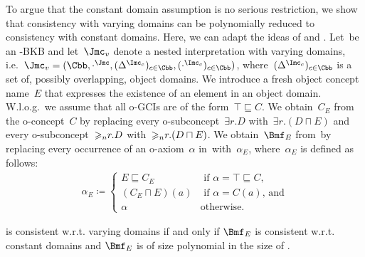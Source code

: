 To argue that the constant domain assumption is no serious restriction, we show that consistency
with varying domains can be polynomially reduced to consistency with constant domains. Here, we can
adapt the ideas of \cite{GKW+-03} and \cite{LuWZ-TIME08}. Let~\Bmf be an \LMLO-BKB and let~$\J_{v}$
denote a nested interpretation with varying domains, i.e.\
$\J_{v} = (\Cbb,\cdot^{\J},(\Delta^{\I_{c}})_{c\in\Cbb},(\cdot^{\I_c})_{c\in\Cbb})$,
where~$(\Delta^{\I_{c}})_{c\in\Cbb}$ is a set of, possibly overlapping, object domains. We introduce
a fresh object concept name~$E$ that expresses the existence of an element in an object
domain. W.l.o.g.\ we assume that all o-GCIs are of the form~$\top \sqsubseteq C$. We obtain~$C_{E}$
from the o-concept~$C$ by replacing every o-subconcept~$\exists r.D$ with~$\exists r.(D \sqcap E)$
and every o-subconcept~${\geqslant_{n}}r.D$ with~${\geqslant_{n}}r.(D \sqcap E)$. We obtain~$\Bmf_{E}$
from~\Bmf by replacing every occurrence of an o-axiom~$\alpha$ in~\Bmf with~$\alpha_{E}$,
where~$\alpha_{E}$ is defined as follows:
\begin{align*}
  \alpha_{E} \coloneqq
  \begin{cases}
    E \sqsubseteq C_{E} & \text{ if $\alpha = \top \sqsubseteq C$,} \\
    (C_{E}\sqcap E)(a) & \text{ if $\alpha = C(a)$, and} \\
    \alpha & \text{otherwise.}
  \end{cases}
\end{align*}
%
\begin{proposition}\label{prop:constant-domain-assumption}
  \Bmf is consistent w.r.t. varying domains if and only if $\Bmf_{E}$ is consistent w.r.t. constant
  domains and $\Bmf_{E}$ is of size polynomial in the size of \Bmf.
\end{proposition}

